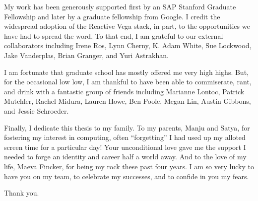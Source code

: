 My work has been generously supported first by an SAP Stanford Graduate
Fellowship and later by a graduate fellowship from Google. I credit the
widespread adoption of the Reactive Vega stack, in part, to the opportunities we
have had to spread the word. To that end, I am grateful to our external
collaborators including Irene Ros, Lynn Cherny, K. Adam White, Sue Lockwood,
Jake Vanderplas, Brian Granger, and Yuri Astrakhan.

I am fortunate that graduate school has mostly offered me very high highs. But,
for the occasional low low, I am thankful to have been able to commiserate,
rant, and drink with a fantastic group of friends including Marianne Lontoc,
Patrick Mutchler, Rachel Midura, Lauren Howe, Ben Poole, Megan Lin, Austin
Gibbons, and Jessie Schroeder.

Finally, I dedicate this thesis to my family. To my parents, Manju and Satya,
for fostering my interest in computing, often ``forgetting'' I had used up my
alloted screen time for a particular day! Your unconditional love gave me the
support I needed to forge an identity and career half a world away. And to the
love of my life, Maeva Fincker, for being my rock these past four years. I am so
very lucky to have you on my team, to celebrate my successes, and to confide in
you my fears.

Thank you.